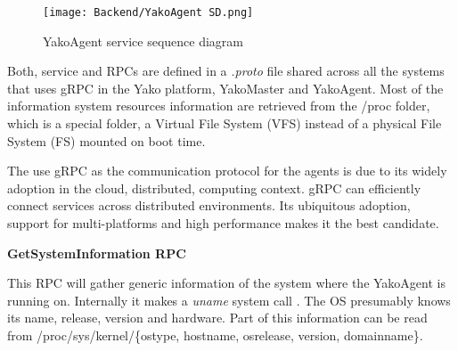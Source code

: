         \begin{figure}[H]
            \centering
            \texttt{[image: Backend/YakoAgent SD.png]}
            \caption{YakoAgent service sequence diagram}
            \label{fig:yakoagent_sd}
        \end{figure}
        
        Both, service and RPCs are defined in a \textit{.proto} file shared across all the systems that uses gRPC in the Yako platform, YakoMaster and YakoAgent. 
        Most of the information system resources information are retrieved from the /proc folder, which is a special folder, a Virtual File System (VFS) instead of a physical File System (FS) mounted on boot time.
        
        
        The use gRPC as the communication protocol for the agents is due to its widely adoption in the cloud, distributed, computing context. gRPC can efficiently connect services across distributed environments. Its ubiquitous adoption, support for multi-platforms and high performance makes it the best candidate.
        
        \textbf{GetSystemInformation RPC}
        
        This RPC will gather generic information of the system where the YakoAgent is running on. Internally it makes a \textit{uname} system call \cite{mackenzie_uname1_nodate}.
        The OS presumably knows its name, release, version and hardware. Part of this information can be read from /proc/sys/kernel/\{ostype, hostname, osrelease, version, domainname\}.
        
        
        

